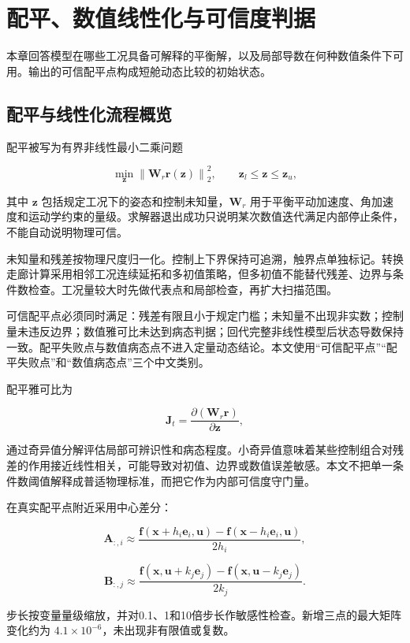 \documentclass[UTF8,12pt,oneside,openany,fontset=windows]{ctexbook}
\begin{document}
\chapter{配平、数值线性化与可信度判据}

本章回答模型在哪些工况具备可解释的平衡解，以及局部导数在何种数值条件下可用。输出的可信配平点构成短舱动态比较的初始状态。

\section{配平与线性化流程概览}

配平被写为有界非线性最小二乘问题

$$\min_{\mathbf{z}}\left\|\mathbf{W}_r\mathbf{r}(\mathbf{z})\right\|_2^2, \qquad \mathbf{z}_l\leq\mathbf{z}\leq\mathbf{z}_u,$$

其中 $\mathbf{z}$ 包括规定工况下的姿态和控制未知量，$\mathbf{W}_r$ 用于平衡平动加速度、角加速度和运动学约束的量级。求解器退出成功只说明某次数值迭代满足内部停止条件，不能自动说明物理可信。

未知量和残差按物理尺度归一化。控制上下界保持可追溯，触界点单独标记。转换走廊计算采用相邻工况连续延拓和多初值策略，但多初值不能替代残差、边界与条件数检查。工况量较大时先做代表点和局部检查，再扩大扫描范围。

可信配平点必须同时满足：残差有限且小于规定门槛；未知量不出现非实数；控制量未违反边界；数值雅可比未达到病态判据；回代完整非线性模型后状态导数保持一致。配平失败点与数值病态点不进入定量动态结论。本文使用“可信配平点”“配平失败点”和“数值病态点”三个中文类别。

配平雅可比为

$$\mathbf{J}_t=\frac{\partial(\mathbf{W}_r\mathbf{r})}{\partial\mathbf{z}},$$

通过奇异值分解评估局部可辨识性和病态程度。小奇异值意味着某些控制组合对残差的作用接近线性相关，可能导致对初值、边界或数值误差敏感。本文不把单一条件数阈值解释成普适物理标准，而把它作为内部可信度守门量。

在真实配平点附近采用中心差分：

$$\mathbf{A}_{:,i}\approx \frac{\mathbf{f}(\mathbf{x}+h_i\mathbf{e}_i,\mathbf{u}) -\mathbf{f}(\mathbf{x}-h_i\mathbf{e}_i,\mathbf{u})}{2h_i},$$

$$\mathbf{B}_{:,j}\approx \frac{\mathbf{f}(\mathbf{x},\mathbf{u}+k_j\mathbf{e}_j) -\mathbf{f}(\mathbf{x},\mathbf{u}-k_j\mathbf{e}_j)}{2k_j}.$$

步长按变量量级缩放，并对0.1、1和10倍步长作敏感性检查。新增三点的最大矩阵变化约为 $4.1\times10^{-6}$，未出现非有限值或复数。
\end{document}
